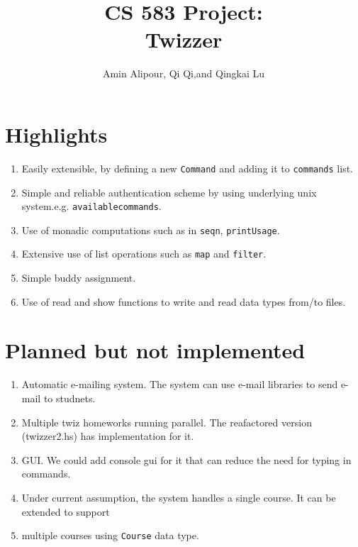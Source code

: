 \documentclass{article}
\title{CS 583 Project:\\Twizzer}
\date{}
\author{Amin Alipour, Qi Qi,and Qingkai Lu}
\begin{document}
\maketitle


\section{Highlights}
\begin{enumerate}
\item Easily extensible, by defining a new  \texttt{Command} and  adding it to  \texttt{commands} list.
\item Simple and reliable  authentication  scheme by using underlying unix system.e.g. \texttt{availablecommands}.
\item Use of monadic computations such as in \texttt{seqn}, \texttt{printUsage}.
\item Extensive use of list operations such as \texttt{map} and \texttt{filter}. 
\item Simple buddy assignment.
\item Use of read and show functions to write  and read  data types from/to files.
\end{enumerate}


\section{Planned but not implemented}
\begin{enumerate}
\item Automatic e-mailing system. The system can use e-mail libraries to send e-mail to studnets.
\item Multiple twiz homeworks running parallel. The reafactored version (twizzer2.hs) has implementation for it.
\item GUI. We could add console gui for it that can reduce the need for typing in commands.
\item Under current assumption,  the system handles a single course. It can be extended to support 
\item multiple courses using \texttt{Course} data type.
\end{enumerate}
\end{document}
